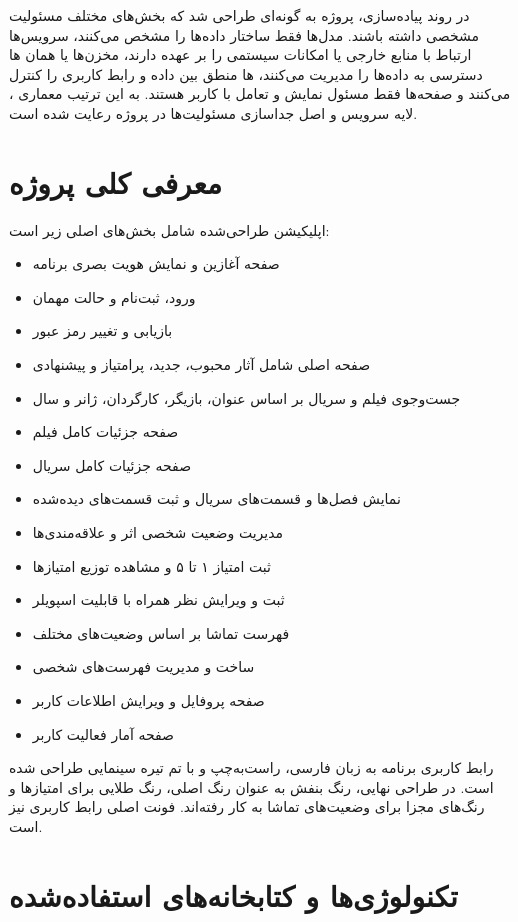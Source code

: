 \documentclass[a4paper,14pt]{extarticle}
\begin{document}
در روند پیاده‌سازی، پروژه به گونه‌ای طراحی شد که بخش‌های مختلف مسئولیت مشخصی داشته باشند. مدل‌ها فقط ساختار داده‌ها را مشخص می‌کنند، سرویس‌ها ارتباط با منابع خارجی یا امکانات سیستمی را بر عهده دارند، مخزن‌ها یا همان ها دسترسی به داده‌ها را مدیریت می‌کنند، ها منطق بین داده و رابط کاربری را کنترل می‌کنند و صفحه‌ها فقط مسئول نمایش و تعامل با کاربر هستند. به این ترتیب معماری ، لایه سرویس و اصل جداسازی مسئولیت‌ها در پروژه رعایت شده است.

\section*{معرفی کلی پروژه}

اپلیکیشن طراحی‌شده شامل بخش‌های اصلی زیر است:

\begin{itemize}
    \item صفحه آغازین و نمایش هویت بصری برنامه
    \item ورود، ثبت‌نام و حالت مهمان
    \item بازیابی و تغییر رمز عبور
    \item صفحه اصلی شامل آثار محبوب، جدید، پرامتیاز و پیشنهادی
    \item جست‌وجوی فیلم و سریال بر اساس عنوان، بازیگر، کارگردان، ژانر و سال
    \item صفحه جزئیات کامل فیلم
    \item صفحه جزئیات کامل سریال
    \item نمایش فصل‌ها و قسمت‌های سریال و ثبت قسمت‌های دیده‌شده
    \item مدیریت وضعیت شخصی اثر و علاقه‌مندی‌ها
    \item ثبت امتیاز ۱ تا ۵ و مشاهده توزیع امتیازها
    \item ثبت و ویرایش نظر همراه با قابلیت اسپویلر
    \item فهرست تماشا بر اساس وضعیت‌های مختلف
    \item ساخت و مدیریت فهرست‌های شخصی
    \item صفحه پروفایل و ویرایش اطلاعات کاربر
    \item صفحه آمار فعالیت کاربر
\end{itemize}

رابط کاربری برنامه به زبان فارسی، راست‌به‌چپ و با تم تیره سینمایی طراحی شده است. در طراحی نهایی، رنگ بنفش به عنوان رنگ اصلی، رنگ طلایی برای امتیازها و رنگ‌های مجزا برای وضعیت‌های تماشا به کار رفته‌اند. فونت اصلی رابط کاربری نیز  است.

\section*{تکنولوژی‌ها و کتابخانه‌های استفاده‌شده}
\end{document}
